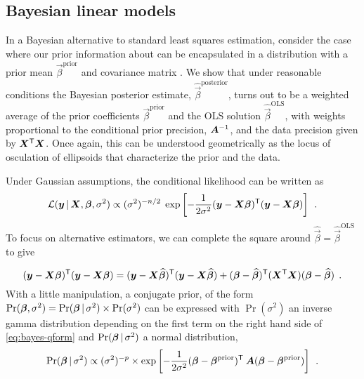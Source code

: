 \subsection{Bayesian linear models}\label{sec:bayesian}

In a Bayesian alternative to standard least squares estimation, consider the case where our prior
information about \vec{\beta} can be encapsulated in a distribution with a prior mean
$\vec{\beta}^{\mathrm{prior}}$ and covariance matrix .  We show that under reasonable conditions
the Bayesian posterior
estimate, $\widehat{\vec{\beta}}^{\mathrm{posterior}}$, turns out
to be a weighted average of the prior coefficients $\vec{\beta}^{\mathrm{prior}}$ and the OLS solution $\widehat{\vec{\beta}}^{\mathrm{OLS}}$,
with weights proportional to the conditional prior precision, $\bm{A}^{-1}$, and the data precision given by
$\bm{X}^\mathsf{T}\bm{X}$.   Once again, this can be understood geometrically as the locus of osculation of
ellipsoids that characterize the prior and the data.

Under Gaussian assumptions,
the conditional likelihood can be written as
\begin{equation*}
\mathcal{L} (\bm{y} \, | \, \bm{X}, \bm{\beta}, \sigma^2) \propto
   (\sigma^2)^{-n/2} \; \exp \left[ -\frac{1}{2 \sigma^2} (\bm{y}-\bm{X} \bm{\beta}) ^\mathsf{T}  (\bm{y}-\bm{X} \bm{\beta})   \right] \:\: .
\end{equation*}
To focus on alternative estimators, we can complete the square around $\widehat{\vec{\beta}} = \widehat{\vec{\beta}}^{\mathrm{OLS}}$ to give

\begin{equation} \label{eq:bayes-qform}
(\bm{y}- \bm{X} \bm{\beta})^\mathsf{T}(\bm{y}- \bm{X} \bm{\beta}) =
(\bm{y}- \bm{X} \widehat{\bm{\beta}})^\mathsf{T}(\bm{y}- \bm{X} \widehat{\bm{\beta}}) +
(\bm{\beta} - \widehat{\bm{\beta}})^\mathsf{T}(\bm{X}^\mathsf{T}\bm{X})(\bm{\beta} - \widehat{\bm{\beta}}) \:\: .
\end{equation}
With a little manipulation, a conjugate prior, of the form $\Pr (\bm{\beta}, \sigma^2) = \Pr (\bm{\beta} \, | \, \sigma^2) \times \Pr (\sigma^2)$
can be expressed with $\Pr (\sigma^2)$ an inverse gamma distribution depending on the first term on the right hand side of \eqref{eq:bayes-qform}
and $\Pr (\bm{\beta} \, | \, \sigma^2)$ a normal distribution,
\begin{equation}
\Pr (\bm{\beta} \, | \, \sigma^2) \propto (\sigma^2)^{-p}  \times \exp \left[ -\frac{1}{2 \sigma^2}  (\bm{\beta} - \bm{\beta}^{\mathrm{prior}}) ^\mathsf{T}  \: \bm{A} (\bm{\beta} - \bm{\beta}^{\mathrm{prior}})  \right] \:\: .
\end{equation}

